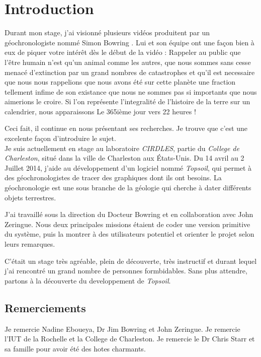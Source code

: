 \chapter{Introduction}

Durant mon stage, j'ai visionné plusieurs vidéos produitent par un géochronologiste nommé Simon Bowring%
. Lui et son équipe ont une façon bien à eux de piquer votre intérêt dès le début de la vidéo : Rappeler au public que l'être humain n'est qu'un animal comme les autres, que nous sommes sans cesse menacé d'extinction par un grand nombres de catastrophes et qu'il est necessaire que nous nous rappelions que nous avons été sur cette planète une fraction tellement infime de son existance que nous ne sommes pas si importants que nous aimerions le croire. Si l'on représente l'integralité de l'histoire de la terre sur un calendrier, nous apparaissons Le 365ième jour vers 22 heures !

Ceci fait, il continue en nous présentant ses recherches. Je trouve que c'est une excelente façon d'introduire le sujet.\\

Je suis actuellement en stage au laboratoire \textit{CIRDLES}, partie du \textit{College de Charleston}, situé dans la ville de Charleston aux États-Unis. %
Du 14 avril au 2 Juillet 2014, j'aide au développement d'un logiciel nommé \textit{Topsoil}, qui permet à des géochronologistes de tracer des graphiques dont ils ont besoins. La géochronologie est une sous branche de la géologie qui cherche à dater différents objets terrestres. 

J'ai travaillé sous la direction du Docteur Bowring et en collaboration avec John Zeringue. Nous deux principales missions étaient de coder une version primitive du système, puis la montrer à des utilisateurs potentiel et orienter le projet selon leurs remarques.

C'était un stage très agréable, plein de découverte, très instructif et durant lequel j'ai rencontré un grand nombre de personnes formbidables. Sans plus attendre, partons à la découverte du developpement de \textit{Topsoil}.

\section{Remerciements}
Je remercie Nadine Eboueya, Dr Jim Bowring et John Zeringue. Je remercie l'IUT de la Rochelle et la College de Charleston. Je remercie le Dr Chris Starr et sa famille pour avoir été des hotes charmants.
